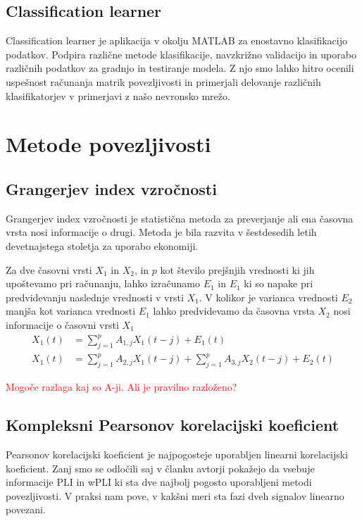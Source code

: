 \subsection{Classification learner}
Classification learner je aplikacija v okolju MATLAB za enostavno klasifikacijo podatkov. Podpira različne metode klasifikacije, navzkrižno validacijo in uporabo različnih podatkov za gradnjo in testiranje modela. Z njo smo lahko hitro ocenili uspešnost računanja matrik povezljivosti in primerjali delovanje različnih klasifikatorjev v primerjavi z našo nevronsko mrežo.

\section{Metode povezljivosti}
\subsection{Grangerjev index vzročnosti}
Grangerjev index vzročnosti je statistična metoda za preverjanje ali ena časovna vrsta nosi informacije o drugi. Metoda je bila razvita v šestdesedih letih devetnajstega stoletja za uporabo ekonomiji.

Za dve časovni vrsti $X_1$ in $X_2$, in $p$ kot število prejšnjih vrednosti ki jih upoštevamo pri računanju, lahko izračunamo $E_1$ in $E_1$ ki so napake pri predvidevanju naslednje vrednosti v vrsti $X_1$. V kolikor je varianca vrednosti $E_2$ manjša kot varianca vrednosti $E_1$ lahko predvidevamo da časovna vrsta $X_2$ nosi informacije o časovni vrsti $X_1$
\begin{align*}
X_1(t) &= \sum_{j=1}^{p} A_{1,j} X_1(t-j) + E_1(t)\\
X_1(t) &= \sum_{j=1}^{p} A_{2,j} X_1(t-j) + \sum_{j=1}^{p} A_{3,j} X_2(t-j) + E_2(t)
\end{align*}


\textcolor{red}{Mogoče razlaga kaj so A-ji. Ali je pravilno razloženo?}

\cite{seth_granger_2007}

\subsection{Kompleksni Pearsonov korelacijski koeficient}
Pearsonov korelacijski koeficient je najpogosteje uporabljen linearni korelacijski koeficient. Zanj smo se odločili saj v članku   avtorji pokažejo da vsebuje informacije PLI in wPLI ki sta dve najbolj pogosto uporabljeni metodi povezljivosti. V praksi nam pove, v kakšni meri sta fazi dveh signalov linearno povezani.

